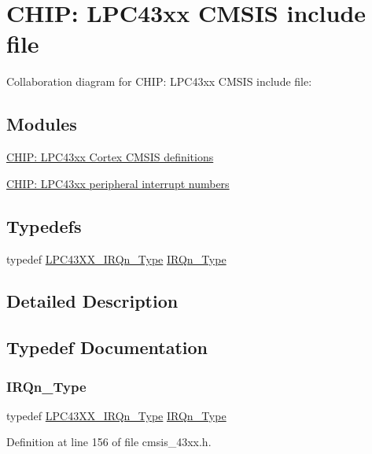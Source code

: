 \hypertarget{group___c_m_s_i_s__43_x_x}{}\section{C\+H\+IP\+: L\+P\+C43xx C\+M\+S\+IS include file}
\label{group___c_m_s_i_s__43_x_x}
Collaboration diagram for C\+H\+IP\+: L\+P\+C43xx C\+M\+S\+IS include file\+:
\subsection*{Modules}
\begin{DoxyCompactItemize}
\item 
\hyperlink{group___c_m_s_i_s__43_x_x___c_o_m_m_o_n}{C\+H\+I\+P\+: L\+P\+C43xx Cortex C\+M\+S\+I\+S definitions}
\item 
\hyperlink{group___c_m_s_i_s__43_x_x___i_r_q}{C\+H\+I\+P\+: L\+P\+C43xx peripheral interrupt numbers}
\end{DoxyCompactItemize}
\subsection*{Typedefs}
\begin{DoxyCompactItemize}
\item 
typedef \hyperlink{group___c_m_s_i_s__43_x_x___i_r_q_ga2018a6433701e9ee9b34797425127919}{L\+P\+C43\+X\+X\+\_\+\+I\+R\+Qn\+\_\+\+Type} \hyperlink{group___c_m_s_i_s__43_x_x_gaebc4a3c3b7989735c473aa4e077cb4a2}{I\+R\+Qn\+\_\+\+Type}
\end{DoxyCompactItemize}


\subsection{Detailed Description}


\subsection{Typedef Documentation}
\mbox{\label{group___c_m_s_i_s__43_x_x_gaebc4a3c3b7989735c473aa4e077cb4a2}} 
\subsubsection{\texorpdfstring{I\+R\+Qn\+\_\+\+Type}{IRQn\_Type}}
{\footnotesize\ttfamily typedef \hyperlink{group___c_m_s_i_s__43_x_x___i_r_q_ga2018a6433701e9ee9b34797425127919}{L\+P\+C43\+X\+X\+\_\+\+I\+R\+Qn\+\_\+\+Type} \hyperlink{group___c_m_s_i_s__18_x_x___i_r_q_gaa44deabd252bda567898bae35a086adc}{I\+R\+Qn\+\_\+\+Type}}



Definition at line 156 of file cmsis\+\_\+43xx.\+h.

